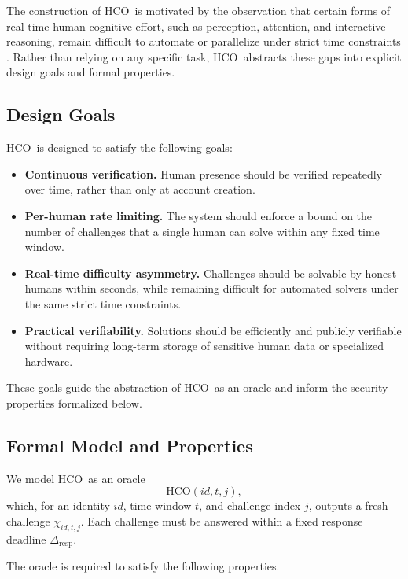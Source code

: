 \documentclass[11pt]{article}
\newcommand{\HCO}{HCO\xspace}
\begin{document}
The construction of \HCO\ is motivated by the observation that certain forms of real-time human cognitive effort, such as perception, attention, and interactive reasoning, remain difficult
 to automate or parallelize under strict time constraints \cite{geirhos2018generalisation,brendel2019approximating}. Rather than relying on any specific task, \HCO\ abstracts these gaps into explicit design goals and formal properties.

\subsection{Design Goals}

\HCO\ is designed to satisfy the following goals:
\begin{itemize}
	\item \textbf{Continuous verification.}
	Human presence should be verified repeatedly over time, rather than only at account creation.
	
	\item \textbf{Per-human rate limiting.}
	The system should enforce a bound on the number of challenges that a single human can solve within any fixed time window.
	
	\item \textbf{Real-time difficulty asymmetry.}
	Challenges should be solvable by honest humans within seconds, while remaining difficult for automated solvers under the same strict time constraints.
	
	\item \textbf{Practical verifiability.}
	Solutions should be efficiently and publicly verifiable without requiring long-term storage of sensitive human data or specialized hardware.
\end{itemize}

These goals guide the abstraction of \HCO\ as an oracle and inform the security properties formalized below.

\subsection{Formal Model and Properties}

We model \HCO\ as an oracle
\[
\mathrm{HCO}(id, t, j),
\]
which, for an identity $id$, time window $t$, and challenge index $j$, outputs a fresh challenge $\chi_{id,t,j}$. Each challenge must be answered within a fixed response deadline $\Delta_{\mathrm{resp}}$.

The oracle is required to satisfy the following properties.
\end{document}
